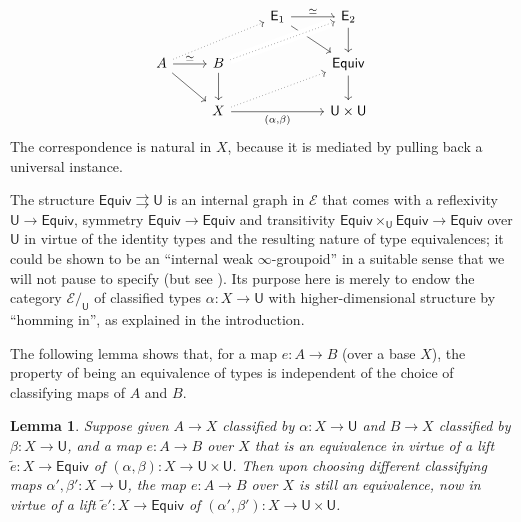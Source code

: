 \documentclass[12pt,reqno]{amsart}
\newcommand{\EE}{\ensuremath{\mathcal{E}}}
\renewcommand{\to}{\ensuremath{\rightarrow}}
\newcommand{\tto}{\ensuremath{\rightrightarrows}}
\newcommand{\T}{\ensuremath{\mathsf{U}}}
\newtheorem{lemma}[theorem]{Lemma}
\theoremstyle{remark}
\theoremstyle{definition}
\begin{document}
\begin{equation}\label{diag:univalence3}
\begin{tikzcd} 
	&& \mathsf{E}_1 \ar[rd]  \ar[r,"{\simeq}"]  & \mathsf{E}_2 \ar[d] \\  
A \ar[rd] \ar[r, "{\simeq}"] \ar[rru, dotted] & B \ar[d] \ar[rru, crossing over, dotted] && \mathsf{Equiv} \ar[d] \\  
& X \ar[rru, dotted] \ar[rr, swap, "{(\alpha, \beta)}"] && \T \times \T
	 \end{tikzcd}
 \end{equation}
The correspondence is natural in $X$, because it is mediated by pulling back a universal instance.  

The structure $\mathsf{Equiv} \tto \T $ is an internal graph in $\EE$ that comes with a reflexivity $\T \to \mathsf{Equiv}$, symmetry $\mathsf{Equiv} \to \mathsf{Equiv}$ and transitivity $\mathsf{Equiv}\times_\T \mathsf{Equiv} \to \mathsf{Equiv}$ over $\T$ in virtue of the identity types and the resulting nature of type equivalences; it could be shown to be an ``internal weak $\infty$-groupoid'' in a suitable sense that we will not pause to specify (but see \cite{Lumsdaine:groupoids}).  Its purpose here is merely to endow the category $\EE/_\T$ of classified types $\alpha : X \to \T$ with higher-dimensional structure by ``homming in'', as explained in the introduction. 

The following lemma shows that, for a map $e : A \to B$ (over a base $X$), the property of being an equivalence of types is independent of the choice of classifying maps of $A$ and $B$.
\begin{lemma}\label{lemma:equivinvariance}
Suppose given $A\to X$ classified by $\alpha: X \to \T$ and $B \to X$ classified by $\beta: X \to \T$, and a map $e : A \to B$ over $X$ that is an equivalence in virtue of a lift $\tilde{e} : X \to  \mathsf{Equiv}$ of $(\alpha, \beta) : X \to \T\times \T$.   Then upon choosing different classifying maps $\alpha', \beta' : X \to \T$, the map $e : A \to B$ over $X$ is still an equivalence, now in virtue of a lift ${\tilde{e}}' : X \to \mathsf{Equiv}$ of $(\alpha', \beta') : X \to \T\times \T$.
\end{lemma}
\end{document}
